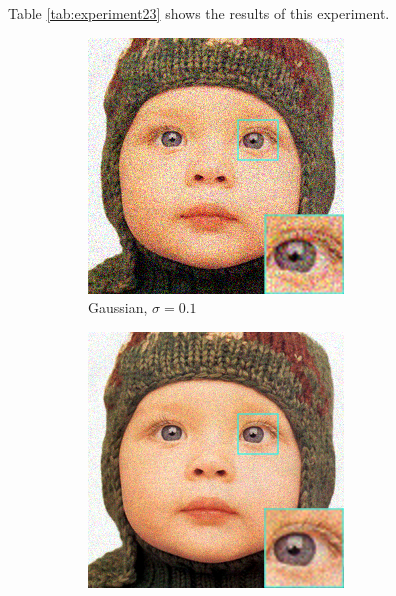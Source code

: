 Table \ref{tab:experiment23} shows the results of this experiment.

\begin{figure}
	\centering
	\begin{subfigure}{0.24\textwidth}
		\includegraphics[width=\textwidth]{images/exp2.3/gaussian0.png}
		\caption{Gaussian, $\sigma=0.1$}
	\end{subfigure}
	\begin{subfigure}{0.24\textwidth}
		\includegraphics[width=\textwidth]{images/exp2.3/poisson0.png}

\end{subfigure}
\end{figure}
